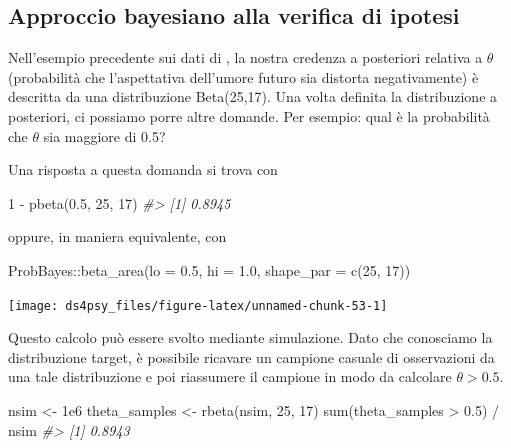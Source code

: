 \documentclass[
  11pt,
]{krantz}
\makeatletter
\newenvironment{Shaded}{\begin{snugshade}}{\end{snugshade}}
\newcommand{\AttributeTok}[1]{\textcolor[rgb]{0.61,0.61,0.61}{#1}}
\newcommand{\CommentTok}[1]{\textcolor[rgb]{0.37,0.37,0.37}{\textit{#1}}}
\newcommand{\DecValTok}[1]{\textcolor[rgb]{0.06,0.06,0.06}{#1}}
\newcommand{\FloatTok}[1]{\textcolor[rgb]{0.06,0.06,0.06}{#1}}
\newcommand{\FunctionTok}[1]{\textcolor[rgb]{0,0,0}{#1}}
\newcommand{\NormalTok}[1]{#1}
\newcommand{\OtherTok}[1]{\textcolor[rgb]{0.37,0.37,0.37}{#1}}
\newcommand{\SpecialCharTok}[1]{\textcolor[rgb]{0,0,0}{#1}}
\newenvironment{kframe}{%
\medskip{}
\setlength{\fboxsep}{.8em}
 \def\at@end@of@kframe{}%
 \ifinner\ifhmode%
  \def\at@end@of@kframe{\end{minipage}}%
  \begin{minipage}{\columnwidth}%
 \fi\fi%
 \def\FrameCommand##1{\hskip\@totalleftmargin \hskip-\fboxsep
 \colorbox{shadecolor}{##1}\hskip-\fboxsep
     \hskip-\linewidth \hskip-\@totalleftmargin \hskip\columnwidth}%
 \MakeFramed {\advance\hsize-\width
   \@totalleftmargin\z@ \linewidth\hsize
   \@setminipage}}%
 {\par\unskip\endMakeFramed%
 \at@end@of@kframe}
\renewenvironment{Shaded}{\begin{kframe}}{\end{kframe}}
\theoremstyle{definition}
\theoremstyle{definition}
\theoremstyle{definition}
\theoremstyle{definition}
\theoremstyle{remark}
\makeatother
\begin{document}
\hypertarget{approccio-bayesiano-alla-verifica-di-ipotesi}{%
\subsection{Approccio bayesiano alla verifica di ipotesi}\label{approccio-bayesiano-alla-verifica-di-ipotesi}}

Nell'esempio precedente sui dati di \citet{zetschefuture2019}, la nostra credenza a posteriori relativa a \(\theta\) (probabilità che l'aspettativa dell'umore futuro sia distorta negativamente) è descritta da una distribuzione Beta(25,17). Una volta definita la distribuzione a posteriori, ci possiamo porre altre domande. Per esempio: qual è la probabilità che \(\theta\) sia maggiore di 0.5?

Una risposta a questa domanda si trova con

\begin{Shaded}
\begin{Highlighting}[]
\DecValTok{1} \SpecialCharTok{{-}} \FunctionTok{pbeta}\NormalTok{(}\FloatTok{0.5}\NormalTok{, }\DecValTok{25}\NormalTok{, }\DecValTok{17}\NormalTok{)}
\CommentTok{\#\textgreater{} [1] 0.8945}
\end{Highlighting}
\end{Shaded}

oppure, in maniera equivalente, con

\begin{Shaded}
\begin{Highlighting}[]
\NormalTok{ProbBayes}\SpecialCharTok{::}\FunctionTok{beta\_area}\NormalTok{(}\AttributeTok{lo =} \FloatTok{0.5}\NormalTok{, }\AttributeTok{hi =} \FloatTok{1.0}\NormalTok{, }\AttributeTok{shape\_par =} \FunctionTok{c}\NormalTok{(}\DecValTok{25}\NormalTok{, }\DecValTok{17}\NormalTok{))}
\end{Highlighting}
\end{Shaded}

\begin{center}\texttt{[image: ds4psy\_files/figure-latex/unnamed-chunk-53-1]} \end{center}

Questo calcolo può essere svolto mediante simulazione. Dato che conosciamo la distribuzione target, è possibile ricavare un campione casuale di osservazioni da una tale distribuzione e poi riassumere il campione in modo da calcolare \(\theta > 0.5\).

\begin{Shaded}
\begin{Highlighting}[]
\NormalTok{nsim }\OtherTok{\textless{}{-}} \FloatTok{1e6}
\NormalTok{theta\_samples }\OtherTok{\textless{}{-}} \FunctionTok{rbeta}\NormalTok{(nsim, }\DecValTok{25}\NormalTok{, }\DecValTok{17}\NormalTok{)}
\FunctionTok{sum}\NormalTok{(theta\_samples }\SpecialCharTok{\textgreater{}} \FloatTok{0.5}\NormalTok{) }\SpecialCharTok{/}\NormalTok{ nsim}
\CommentTok{\#\textgreater{} [1] 0.8943}
\end{Highlighting}
\end{Shaded}
\end{document}

